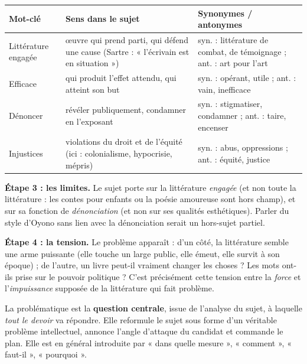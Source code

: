 \documentclass[11pt]{article}
\newcommand{\cle}[1]{{\popxbold\color{popdark}#1}}
\newcounter{popsec}
\newcounter{popsub}
\newcommand{\courssub}[1]{%
  \stepcounter{popsub}%
  \par\vspace{9pt}\noindent{\popxbold\fontsize{11.5}{13}\selectfont\color{popink}{\color{poporange}\thepopsec.\thepopsub}\hspace{6pt}#1}\par\nopagebreak\vspace{4pt}
}
\begin{document}
\begin{center}
\begin{tabularx}{\linewidth}{|l|X|X|}
\hline
\rowcolor{popblueL} \textbf{Mot-clé} & \textbf{Sens dans le sujet} & \textbf{Synonymes / antonymes} \\
\hline
Littérature engagée & œuvre qui prend parti, qui défend une cause (Sartre : « l'écrivain est en situation ») & syn. : littérature de combat, de témoignage ; ant. : art pour l'art \\
\hline
Efficace & qui produit l'effet attendu, qui atteint son but & syn. : opérant, utile ; ant. : vain, inefficace \\
\hline
Dénoncer & révéler publiquement, condamner en l'exposant & syn. : stigmatiser, condamner ; ant. : taire, encenser \\
\hline
Injustices & violations du droit et de l'équité (ici : colonialisme, hypocrisie, mépris) & syn. : abus, oppressions ; ant. : équité, justice \\
\hline
\end{tabularx}
\end{center}

\textbf{Étape 3 : les limites.} Le sujet porte sur la littérature \emph{engagée} (et non toute la littérature : les contes pour enfants ou la poésie amoureuse sont hors champ), et sur sa fonction de \emph{dénonciation} (et non sur ses qualités esthétiques). Parler du style d'Oyono sans lien avec la dénonciation serait un hors-sujet partiel.

\textbf{Étape 4 : la tension.} Le problème apparaît : d'un côté, la littérature semble une arme puissante (elle touche un large public, elle émeut, elle survit à son époque) ; de l'autre, un livre peut-il vraiment changer les choses ? Les mots ont-ils prise sur le pouvoir politique ? C'est précisément cette tension entre la \emph{force} et l'\emph{impuissance} supposée de la littérature qui fait problème.

\courssub{Formuler la problématique}

\begin{definition}[Problématique]
La \cle{problématique} est la \textbf{question centrale}, issue de l'analyse du sujet, à laquelle \emph{tout le devoir} va répondre. Elle reformule le sujet sous forme d'un véritable problème intellectuel, annonce l'angle d'attaque du candidat et commande le plan. Elle est en général introduite par « dans quelle mesure », « comment », « faut-il », « pourquoi ».
\end{definition}
\end{document}
